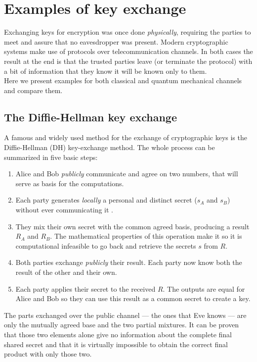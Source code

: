 \section{Examples of key exchange}
	Exchanging keys for encryption was once done \textit{physically}, requiring the parties to meet and assure that no eavesdropper was present.
	Modern cryptographic systems make use of protocols over telecommunication channels. 
	In both cases the result at the end is that the trusted parties leave (or terminate the protocol) with a bit of information that they know it will be known only to them.\\
	Here we present examples for both classical and quantum mechanical channels and compare them.
		\subsection{The Diffie-Hellman key exchange}
		\label{Diffie}
	
		A famous and widely used method for the exchange of cryptographic keys is the Diffie-Hellman (DH) key-exchange method.
	The whole process can be summarized in five basic steps:
	\begin{enumerate}
		\item Alice and Bob \emph{publicly} communicate and agree on two numbers, that will serve as basis for the computations.
		\item Each party generates \emph{locally} a personal and distinct secret ($s_A$ and $s_B$) without ever communicating it .
		\item They mix their own secret with the common agreed basis, producing a result $R_A$ and $R_B$. The mathematical properties of this operation make it so it is computational infeasible to go back and retrieve the secrets $s$ from $R$.
		\item Both parties exchange \emph{publicly} their result. Each party now know both the result of the other and their own.
		\item Each party applies their secret to the received $R$. The outputs are equal for Alice and Bob so they can use this result as a common secret to create a key.
	\end{enumerate}	 
	
	The parts exchanged over the public channel --- the ones that Eve knows --- are only the mutually agreed base and the two partial mixtures. 
	It can be proven that those two elements alone give no information about the complete final shared secret and that it is virtually impossible to obtain the correct final product with only those two.\\  
	

